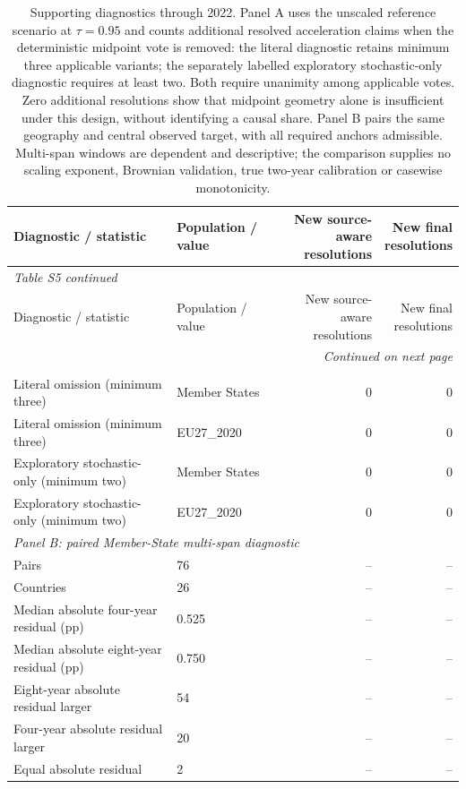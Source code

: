 \begingroup
\footnotesize
\setlength{\tabcolsep}{3pt}
\setlength{\LTcapwidth}{\linewidth}
\renewcommand{\arraystretch}{1.1}
\begin{longtable}{p{6.1cm}lrr}
\caption{Supporting diagnostics through 2022. Panel A uses the unscaled reference scenario at $\tau=0.95$ and counts additional resolved acceleration claims when the deterministic midpoint vote is removed: the literal diagnostic retains minimum three applicable variants; the separately labelled exploratory stochastic-only diagnostic requires at least two. Both require unanimity among applicable votes. Zero additional resolutions show that midpoint geometry alone is insufficient under this design, without identifying a causal share. Panel B pairs the same geography and central observed target, with all required anchors admissible. Multi-span windows are dependent and descriptive; the comparison supplies no scaling exponent, Brownian validation, true two-year calibration or casewise monotonicity.}\label{tab:S5} \\
\toprule
Diagnostic / statistic & Population / value & \shortstack{New source-aware\\resolutions} & \shortstack{New final\\resolutions} \\
\midrule
\endfirsthead
\multicolumn{4}{l}{\textit{Table S5 continued}} \\
\toprule
Diagnostic / statistic & Population / value & \shortstack{New source-aware\\resolutions} & \shortstack{New final\\resolutions} \\
\midrule
\endhead
\midrule
\multicolumn{4}{r}{\textit{Continued on next page}} \\
\endfoot
\bottomrule
\endlastfoot
\multicolumn{4}{l}{\textit{Panel A: midpoint attribution}} \\
Literal omission (minimum three) & Member States & 0 & 0 \\
Literal omission (minimum three) & EU27\_2020 & 0 & 0 \\
Exploratory stochastic-only (minimum two) & Member States & 0 & 0 \\
Exploratory stochastic-only (minimum two) & EU27\_2020 & 0 & 0 \\
\midrule
\multicolumn{4}{l}{\textit{Panel B: paired Member-State multi-span diagnostic}} \\
Pairs & 76 & -- & -- \\
Countries & 26 & -- & -- \\
Median absolute four-year residual (pp) & 0.525 & -- & -- \\
Median absolute eight-year residual (pp) & 0.750 & -- & -- \\
Eight-year absolute residual larger & 54 & -- & -- \\
Four-year absolute residual larger & 20 & -- & -- \\
Equal absolute residual & 2 & -- & -- \\
\end{longtable}

\endgroup
